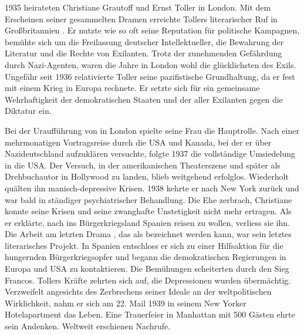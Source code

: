 1935 heirateten Christiane Grautoff und Ernst Toller in London. Mit dem
Erscheinen seiner gesammelten Dramen erreichte Tollers literarischer Ruf in
Großbritannien \Cite{wohl seinen Höhepunkt}. Er nutzte wie so
oft seine Reputation für politische Kampagnen, bemühte sich um die Freilassung
deutscher Intellektueller, die Bewahrung der \Cite{verbrannten} Literatur und
die Rechte von Exilanten. Trotz der zunehmenden Gefährdung durch Nazi-Agenten,
waren die Jahre in London wohl die glücklichsten des Exils. Ungefähr seit
1936 relativierte Toller seine pazifistische Grundhaltung, da er fest mit
einem Krieg in Europa rechnete. Er setzte sich für ein gemeinsame
Wehrhaftigkeit der demokratischen Staaten und der \Cite{Volksfront} aller
Exilanten gegen die Diktatur ein.

Bei der Uraufführung von \Cite{No more peace!} in London spielte seine Frau
die Hauptrolle. Nach einer
mehrmonatigen Vortragsreise durch die USA und Kanada, bei der er über
Nazideutschland aufzuklären versuchte, folgte 1937 die vollständige
Umsiedelung in die USA. Der Versuch, in der amerikanischen Theaterszene und
später als Drehbuchautor in Hollywood zu landen, blieb weitgehend
erfolglos. Wiederholt quälten ihn manisch-depressive Krisen. 1938 kehrte er
nach New York zurück und war bald in ständiger psychiatrischer Behandlung. Die
Ehe zerbrach, Christiane konnte seine Krisen und seine zwanghafte Unstetigkeit
nicht mehr ertragen. Als er erklärte, nach ins Bürgerkriegsland Spanien reisen
zu wollen, verliess sie ihn.
Die Arbeit am letzten Drama \Cite{Pastor Hall},
das als \Cite{Märtyrertragödie} bezeichnet werden kann, war sein letztes
literarisches Projekt. In Spanien entschloss er sich zu einer Hilfsaktion für
die hungernden Bürgerkriegsopfer und begann die demokratischen Regierungen in
Europa und USA zu kontaktieren.  Die Bemühungen scheiterten durch den Sieg
Francos. Tollers Kräfte zehrten sich auf, die Depressionen wurden
übermächtig. 
Verzweifelt angesichts des Zerbrechens seiner Ideale an der weltpolitischen 
Wirklichkeit, nahm er sich am 22. Mail 1939 in seinem New Yorker Hotelapartment das
Leben. Eine Trauerfeier in Manhattan mit 500 Gästen ehrte sein
Andenken. Weltweit erschienen Nachrufe.


